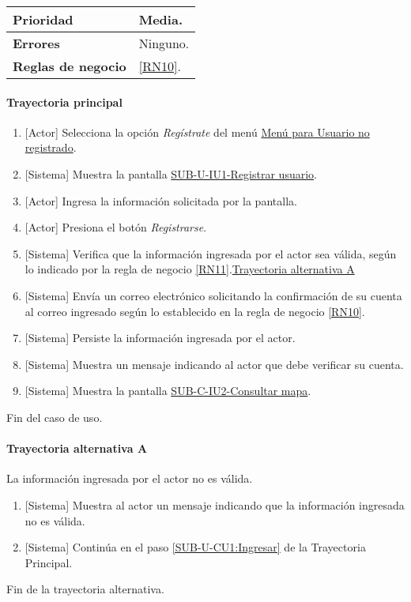 \begin{longtable}{|J{5cm}|J{10.3cm}|}
		\\ \hline 
	\textbf{Prioridad} & 
		Media. \\ \hline
	\textbf{Errores} & Ninguno.
		\\ \hline
	\textbf{Reglas de negocio} & \ref{RN10}.
		 \\ \hline
\end{longtable}

\paragraph{Trayectoria principal}
	\begin{enumerate}
		\item {[Actor]} Selecciona la opción \textit{Regístrate} del menú \hyperref[fig:menu-usuario]{Menú para Usuario no registrado}.
		\item {[Sistema]} Muestra la pantalla \hyperref[fig:sub-u-iu1]{SUB-U-IU1-Registrar usuario}.
		\item \label{SUB-U-CU1:Ingresar} {[Actor]} Ingresa la información solicitada por la pantalla.
		\item {[Actor]} Presiona el botón \textit{Registrarse}.
		\item {[Sistema]} Verifica que la información ingresada por el actor sea válida, según lo indicado por la regla de negocio \ref{RN11}.\hyperref[SUB-U-CU1:TA]{Trayectoria alternativa A}
		\item {[Sistema]} Envía un correo electrónico solicitando la confirmación de su cuenta al correo ingresado según lo establecido en la regla de negocio \ref{RN10}.
		\item {[Sistema]} Persiste la información ingresada por el actor.
		\item {[Sistema]} Muestra un mensaje indicando al actor que debe verificar su cuenta.
		\item \label{SUB-U-CU1:Pantalla} {[Sistema]} Muestra la pantalla \hyperref[fig:sub-c-iu2]{SUB-C-IU2-Consultar mapa}.
	\end{enumerate}
	Fin del caso de uso.

\paragraph{Trayectoria alternativa A} \label{SUB-U-CU1:TA}
	La información ingresada por el actor no es válida.
	\begin{enumerate}[label=A\arabic*.]
		\item {[Sistema]} Muestra al actor un mensaje indicando que la información ingresada no es válida.
		\item {[Sistema]} Continúa en el paso \ref{SUB-U-CU1:Ingresar} de la Trayectoria Principal.
	\end{enumerate}
	Fin de la trayectoria alternativa.

